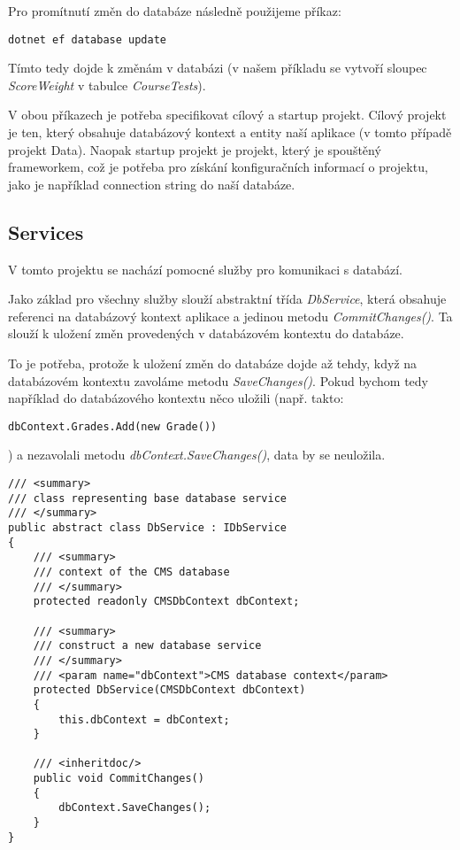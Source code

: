 Pro promítnutí změn do databáze následně použijeme příkaz:

\begin{lstlisting}
dotnet ef database update
\end{lstlisting}

Tímto tedy dojde k změnám v databázi (v našem příkladu se vytvoří sloupec \textit{ScoreWeight} v tabulce \textit{CourseTests}).

V obou příkazech je potřeba specifikovat cílový a startup projekt. Cílový projekt je ten, který obsahuje databázový kontext a entity naší aplikace (v tomto případě projekt Data). Naopak startup projekt je projekt, který je spouštěný frameworkem, což je potřeba pro získání konfiguračních informací o projektu, jako je například connection string do naší databáze.

\subsection{Services}
V tomto projektu se nachází pomocné služby pro komunikaci s databází. 

Jako základ pro všechny služby slouží abstraktní třída \textit{DbService}, která obsahuje referenci na databázový kontext aplikace a jedinou metodu \textit{CommitChanges()}. Ta slouží k uložení změn provedených v databázovém kontextu do databáze. 

To je potřeba, protože k uložení změn do databáze dojde až tehdy, když na databázovém kontextu zavoláme metodu \textit{SaveChanges()}. Pokud bychom tedy například do databázového kontextu něco uložili (např. takto: 
\begin{lstlisting}
dbContext.Grades.Add(new Grade())
\end{lstlisting})
a nezavolali metodu \textit{dbContext.SaveChanges()}, data by se neuložila.

\begin{lstlisting}
/// <summary>
/// class representing base database service
/// </summary>
public abstract class DbService : IDbService
{
	/// <summary>
	/// context of the CMS database
	/// </summary>
	protected readonly CMSDbContext dbContext;
	
	/// <summary>
	/// construct a new database service
	/// </summary>
	/// <param name="dbContext">CMS database context</param>
	protected DbService(CMSDbContext dbContext)
	{
		this.dbContext = dbContext;
	}
	
	/// <inheritdoc/>
	public void CommitChanges()
	{
		dbContext.SaveChanges();
	}
}
\end{lstlisting}

